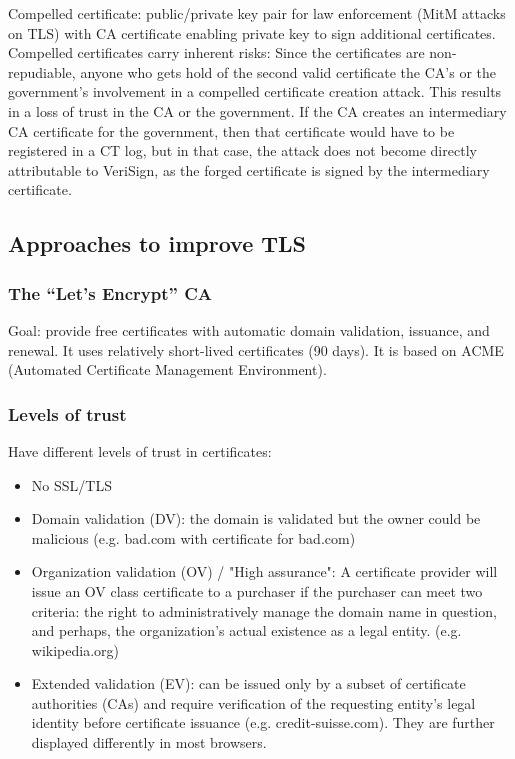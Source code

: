 \documentclass[11pt,oneside,a4paper]{article}
\begin{document}
Compelled certificate: public/private key pair for law enforcement (MitM attacks on TLS) with CA certificate enabling private key to sign additional certificates. Compelled certificates carry inherent risks: Since the certificates are non-repudiable, anyone who gets hold of the second valid certificate the CA's or the government's involvement in a compelled certificate creation attack. This results in a loss of trust in the CA or the government. If the CA creates an intermediary CA certificate for the government, then that certificate would have to be registered in a CT log, but in that case, the attack
does not become directly attributable to VeriSign, as the forged certificate is signed by the intermediary certificate.

\newpage

\subsection{Approaches to improve TLS}

\subsubsection{The “Let’s Encrypt” CA}

Goal: provide free certificates with automatic domain validation, issuance, and renewal. It uses relatively short-lived certificates (90 days). It is based on ACME (Automated Certificate Management Environment).

\subsubsection{Levels of trust}

Have different levels of trust in certificates:

\vspace{-\topsep}
\begin{itemize}
	\setlength{\itemsep}{0pt}
	\setlength{\parskip}{0pt}
	\item No SSL/TLS
	\item Domain validation (DV): the domain is validated but the owner could be malicious (e.g. bad.com with certificate for bad.com)
	\item Organization validation (OV) / "High assurance": A certificate provider will issue an OV class certificate to a purchaser if the purchaser can meet two criteria: the right to administratively manage the domain name in question, and perhaps, the organization's actual existence as a legal entity. (e.g. wikipedia.org)
	\item Extended validation (EV): can be issued only by a subset of certificate authorities (CAs) and require verification of the requesting entity's legal identity before certificate issuance (e.g. credit-suisse.com). They are further displayed differently in most browsers. 
\end{itemize}
\vspace{-\topsep}
\end{document}
